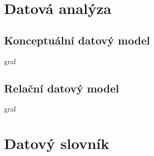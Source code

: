 \documentclass[czech,12pt,a4paper,titlepage]{article}
\begin{document}
    \clearpage


    \section{Datová analýza}\label{sec:datova-analyza}
    \subsection*{Konceptuální datový model}
    graf

    \subsection*{Relační datový model}
    \bigskip
    \bigskip
    \bigskip
    graf

    \clearpage

    \section*{Datový slovník}
    
\end{document}
